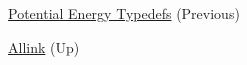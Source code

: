 
\begin{DoxyItemize}
\item \hyperlink{typedef_page}{Potential Energy Typedefs} (Previous)  
\item \hyperlink{index}{Allink} (Up)  
\end{DoxyItemize}